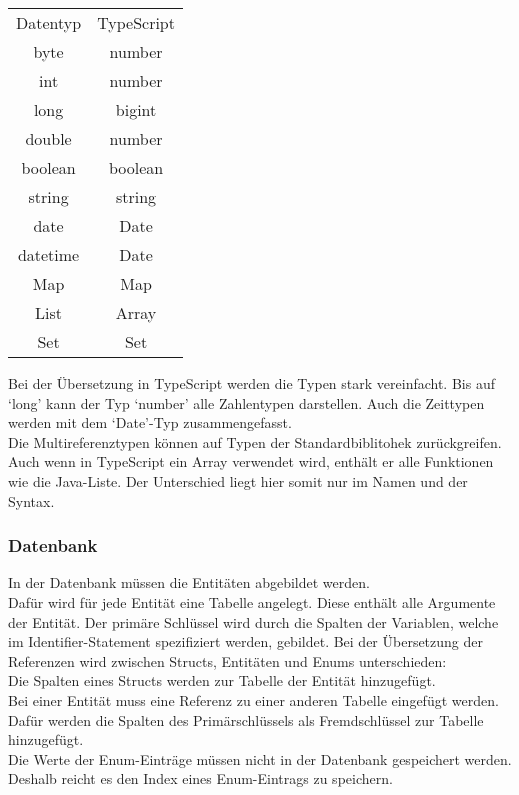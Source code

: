 \documentclass[./einleitung.tex]{subfiles}
\begin{document}
    \begin{center}
        \begin{tabular}{| c || c |}
            \hline
            Datentyp & TypeScript \\
            \hhline{|=||=|}
            byte     & number     \\
            \hline
            int      & number     \\
            \hline
            long     & bigint     \\
            \hline
            double   & number     \\
            \hline
            boolean  & boolean    \\
            \hline
            string   & string     \\
            \hline
            date     & Date       \\
            \hline
            datetime & Date       \\
            \hline
            Map & Map\\
            \hline
            List & Array\\
            \hline
            Set & Set\\
            \hline
        \end{tabular}
    \end{center}
    Bei der Übersetzung in TypeScript werden die Typen stark vereinfacht.
    Bis auf `long' kann der Typ `number' alle Zahlentypen darstellen.
    Auch die Zeittypen werden mit dem `Date'-Typ zusammengefasst.\\
    Die Multireferenztypen können auf Typen der Standardbiblitohek zurückgreifen.
    Auch wenn in TypeScript ein Array verwendet wird, enthält er alle Funktionen wie die Java-Liste.
    Der Unterschied liegt hier somit nur im Namen und der Syntax.

    \subsubsection{Datenbank}\label{subsubsec:db-schema}
    In der Datenbank müssen die Entitäten abgebildet werden.\\
    Dafür wird für jede Entität eine Tabelle angelegt.
    Diese enthält alle Argumente der Entität.
    Der primäre Schlüssel wird durch die Spalten der Variablen, welche im Identifier-Statement spezifiziert werden, gebildet.
    Bei der Übersetzung der Referenzen wird zwischen Structs, Entitäten und Enums unterschieden:\\
    Die Spalten eines Structs werden zur Tabelle der Entität hinzugefügt.\\
    Bei einer Entität muss eine Referenz zu einer anderen Tabelle eingefügt werden.
    Dafür werden die Spalten des Primärschlüssels als Fremdschlüssel zur Tabelle hinzugefügt.\\
    Die Werte der Enum-Einträge müssen nicht in der Datenbank gespeichert werden.
    Deshalb reicht es den Index eines Enum-Eintrags zu speichern.
\end{document}
